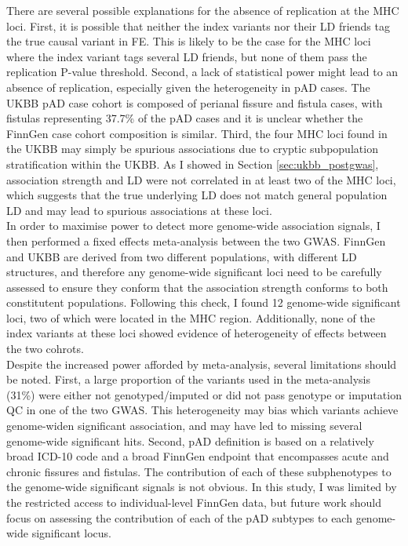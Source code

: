 There are several possible explanations for the absence of replication at the MHC loci. First, it is possible that neither the index variants nor their LD friends tag the true causal variant in FE. This is likely to be the case for the MHC loci where the index variant tags several LD friends, but none of them pass the replication P-value threshold. Second, a lack of statistical power might lead to an absence of replication, especially given the heterogeneity in pAD cases. The UKBB pAD case cohort is composed of perianal fissure and fistula cases, with fistulas representing 37.7\% of the pAD cases and it is unclear whether the FinnGen case cohort composition is similar. Third, the four MHC loci found in the UKBB may simply be spurious associations due to cryptic subpopulation stratification within the UKBB. As I showed in Section \ref{sec:ukbb_postgwas}, association strength and LD were not correlated in at least two of the MHC loci, which suggests that the true underlying LD does not match general population LD and may lead to spurious associations at these loci. \\

In order to maximise power to detect more genome-wide association signals, I then performed a fixed effects meta-analysis between the two GWAS. FinnGen and UKBB are derived from two different populations, with different LD structures, and therefore any genome-wide significant loci need to be carefully assessed to ensure they conform that the association strength conforms to both constitutent populations. Following this check, I found 12 genome-wide significant loci, two of which were located in the MHC region. Additionally, none of the index variants at these loci showed evidence of heterogeneity of effects between the two cohrots.\\

Despite the increased power afforded by meta-analysis, several limitations should be noted. First, a large proportion of the variants used in the meta-analysis (31\%) were either not genotyped/imputed or did not pass genotype or imputation QC in one of the two GWAS. This heterogeneity may bias which variants achieve genome-widen significant association, and may have led to missing several genome-wide significant hits. Second, pAD definition is based on a relatively broad ICD-10 code and a broad FinnGen endpoint that encompasses acute and chronic fissures and fistulas. The contribution of each of these subphenotypes to the genome-wide significant signals is not obvious. In this study, I was limited by the restricted access to individual-level FinnGen data, but future work should focus on assessing the contribution of each of the pAD subtypes to each genome-wide significant locus. \\

